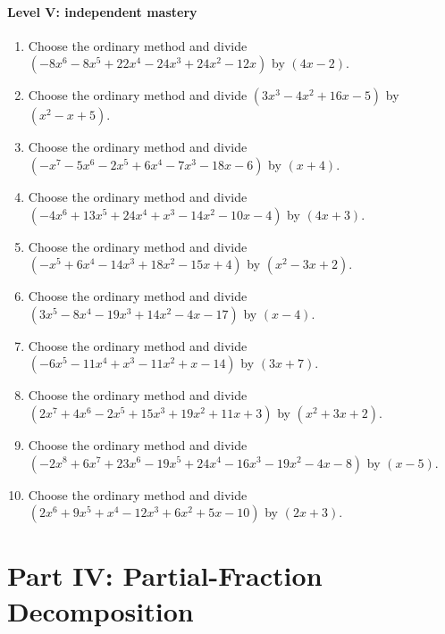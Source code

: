 \documentclass[11pt,oneside]{book}
\begin{document}
\subsection*{Level V: independent mastery}
\begin{enumerate}[leftmargin=*,label=\textbf{\arabic*.},itemsep=0.65\baselineskip]
\item Choose the ordinary method and divide $(- 8 x^{6} - 8 x^{5} + 22 x^{4} - 24 x^{3} + 24 x^{2} - 12 x)$ by $(4 x - 2)$.
\item Choose the ordinary method and divide $(3 x^{3} - 4 x^{2} + 16 x - 5)$ by $(x^{2} - x + 5)$.
\item Choose the ordinary method and divide $(- x^{7} - 5 x^{6} - 2 x^{5} + 6 x^{4} - 7 x^{3} - 18 x - 6)$ by $(x + 4)$.
\item Choose the ordinary method and divide $(- 4 x^{6} + 13 x^{5} + 24 x^{4} + x^{3} - 14 x^{2} - 10 x - 4)$ by $(4 x + 3)$.
\item Choose the ordinary method and divide $(- x^{5} + 6 x^{4} - 14 x^{3} + 18 x^{2} - 15 x + 4)$ by $(x^{2} - 3 x + 2)$.
\item Choose the ordinary method and divide $(3 x^{5} - 8 x^{4} - 19 x^{3} + 14 x^{2} - 4 x - 17)$ by $(x - 4)$.
\item Choose the ordinary method and divide $(- 6 x^{5} - 11 x^{4} + x^{3} - 11 x^{2} + x - 14)$ by $(3 x + 7)$.
\item Choose the ordinary method and divide $(2 x^{7} + 4 x^{6} - 2 x^{5} + 15 x^{3} + 19 x^{2} + 11 x + 3)$ by $(x^{2} + 3 x + 2)$.
\item Choose the ordinary method and divide $(- 2 x^{8} + 6 x^{7} + 23 x^{6} - 19 x^{5} + 24 x^{4} - 16 x^{3} - 19 x^{2} - 4 x - 8)$ by $(x - 5)$.
\item Choose the ordinary method and divide $(2 x^{6} + 9 x^{5} + x^{4} - 12 x^{3} + 6 x^{2} + 5 x - 10)$ by $(2 x + 3)$.
\end{enumerate}
\part{Part IV: Partial-Fraction Decomposition}
\end{document}
